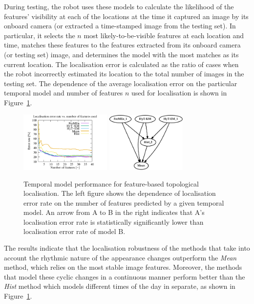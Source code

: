 During testing, the robot uses these models to calculate the likelihood of the features' visibility at each of the locations at the time it captured an image by its onboard camera (or extracted a time-stamped image from the testing set).
In particular, it selects the $n$ most likely-to-be-visible features at each location and time, matches these features to the features extracted from its onboard camera (or testing set) image, and determines the model with the most matches as its current location.
The localisation error is calculated as the ratio of cases when the robot incorrectly estimated its location to the total number of images in the testing set. 
The dependence of the average localisation error on the particular temporal model and number of features $n$ used for localisation is shown in Figure~\ref{fig:features}.
%
\begin{figure}[!ht]
   \begin{center}
   \hfill
      \includegraphics[height=3.0cm]{fig/localisation_graph}
      \hfill
      \includegraphics[height=2.95cm]{fig/localisation_stat}
      \hfill
      \caption{Temporal model performance for feature-based topological localisation. The left figure shows the dependence of localisation error rate on the number of features predicted by a given temporal model.
An arrow from A to B in the right indicates that A's localisation error rate is statistically significantly lower than localisation error rate of model B.\label{fig:features}}
   \end{center}
\end{figure}
%
The results indicate that the localisation robustness of the methods that take into account the rhythmic nature of the appearance changes outperform the \textit{Mean} method, which relies on the most stable image features.
Moreover, the methods that model these cyclic changes in a continuous manner perform better than the \textit{Hist} method which models different times of the day in separate, as shown in Figure~\ref{fig:features}. 

